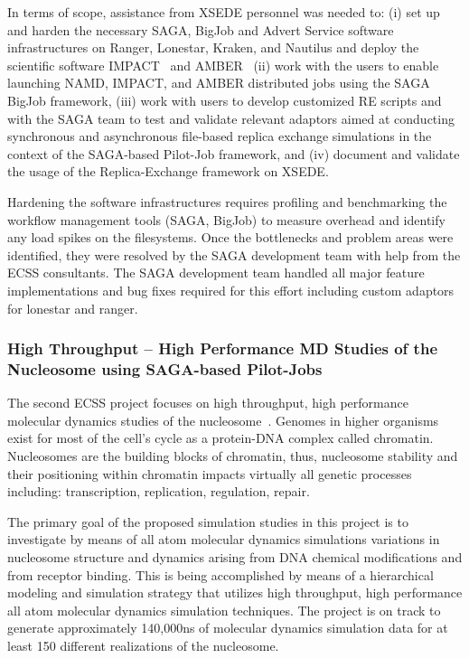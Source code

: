 \documentclass{sig-alternate}
\begin{document}
In terms of scope, assistance from XSEDE personnel was needed to: (i) set up and
harden the necessary SAGA, BigJob and Advert Service software infrastructures on
Ranger, Lonestar, Kraken, and Nautilus and deploy the scientific software
IMPACT~\cite{IMPACT} and AMBER~\cite{AMBER} (ii) work with the
users to enable launching NAMD, IMPACT, and AMBER distributed jobs using the
SAGA BigJob framework, (iii) work with users to develop customized RE scripts
and with the SAGA team to test and validate relevant adaptors aimed at
conducting synchronous and asynchronous ﬁle-based replica exchange simulations
in the context of the SAGA-based Pilot-Job framework, and (iv)  document and
validate the usage of the Replica-Exchange framework on XSEDE.

Hardening the software infrastructures requires profiling and benchmarking the
workflow management tools (SAGA, BigJob) to measure overhead and identify any
load spikes on the filesystems. Once the bottlenecks and problem areas were
identified, they were resolved by the SAGA development team with help from
the ECSS consultants. The SAGA development team handled all major feature
implementations and bug fixes required for this effort including custom
adaptors for lonestar and ranger. 

\subsubsection{High Throughput – High Performance MD Studies of the Nucleosome
using SAGA-based Pilot-Jobs}
The second ECSS project focuses on high throughput, high performance molecular
dynamics studies of the nucleosome~\cite{TomBishop}. Genomes in higher organisms
exist for most of the cell's cycle as a protein-DNA complex called chromatin.
Nucleosomes are the building blocks of chromatin, thus, nucleosome stability and
their positioning within chromatin impacts virtually all genetic processes
including: transcription, replication, regulation, repair.

The primary goal of the proposed simulation studies in this project is to
investigate by means of all atom molecular dynamics simulations variations in
nucleosome structure and dynamics arising from DNA chemical modifications and
from receptor binding. This is being accomplished by means of a hierarchical
modeling and simulation strategy that utilizes high throughput, high
performance all atom molecular dynamics simulation techniques. The project is
on track to generate approximately 140,000ns of molecular dynamics simulation
data for at least 150 different realizations of the nucleosome.
\end{document}
